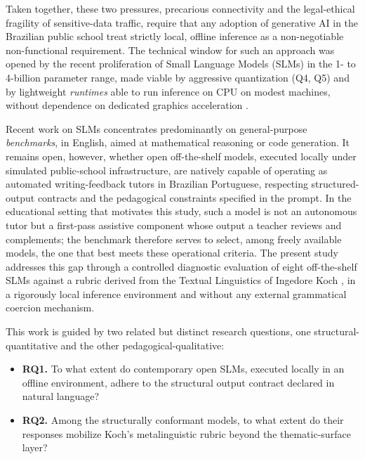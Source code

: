 \documentclass{sbc2023}%
\begin{document}
Taken together, these two pressures, precarious connectivity and the legal-ethical fragility of sensitive-data traffic, require that any adoption of generative AI in the Brazilian public school treat strictly local, offline inference as a non-negotiable non-functional requirement. The technical window for such an approach was opened by the recent proliferation of Small Language Models (SLMs) in the 1- to 4-billion parameter range, made viable by aggressive quantization (Q4, Q5) and by lightweight \textit{runtimes} able to run inference on CPU on modest machines, without dependence on dedicated graphics acceleration \citep{abdin2024phi3,yang2024qwen25}.

Recent work on SLMs concentrates predominantly on general-purpose \textit{benchmarks}, in English, aimed at mathematical reasoning or code generation. It remains open, however, whether open off-the-shelf models, executed locally under simulated public-school infrastructure, are natively capable of operating as automated writing-feedback tutors in Brazilian Portuguese, respecting structured-output contracts and the pedagogical constraints specified in the prompt. In the educational setting that motivates this study, such a model is not an autonomous tutor but a first-pass assistive component whose output a teacher reviews and complements; the benchmark therefore serves to select, among freely available models, the one that best meets these operational criteria. The present study addresses this gap through a controlled diagnostic evaluation of eight off-the-shelf SLMs against a rubric derived from the Textual Linguistics of Ingedore Koch \citep{koch2018coesao,koch2020introducao}, in a rigorously local inference environment and without any external grammatical coercion mechanism.

This work is guided by two related but distinct research questions, one structural-quantitative and the other pedagogical-qualitative:

\begin{itemize}
\item \textbf{RQ1.} To what extent do contemporary open SLMs, executed locally in an offline environment, adhere to the structural output contract declared in natural language?
\item \textbf{RQ2.} Among the structurally conformant models, to what extent do their responses mobilize Koch's metalinguistic rubric beyond the thematic-surface layer?
\end{itemize}
\end{document}
